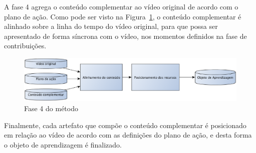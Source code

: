 A fase 4 agrega o conteúdo complementar ao vídeo original de acordo com o plano de ação. Como pode ser visto na Figura~\ref{fig:metodo:fase4}, o conteúdo complementar é alinhado sobre a linha do tempo do vídeo original, para que possa ser apresentado de forma síncrona com o vídeo, nos momentos definidos na fase de contribuições.

\begin{figure}[ht]
\centering
\includegraphics[width=.99\textwidth]{imagens/metodo/fase4_oa.eps}
\caption{Fase 4 do método}
\label{fig:metodo:fase4}
\end{figure}

Finalmente, cada artefato que compõe o conteúdo complementar é posicionado em relação ao vídeo de acordo com as definições do plano de ação, e desta forma o objeto de aprendizagem é finalizado.

